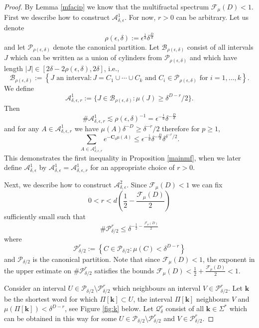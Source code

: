 \documentclass[10pt,a4paper]{amsart}
\def\A{\ensuremath{\mathscr A}}
\def\F{\ensuremath{\mathcal F}}
\begin{document}
\begin{proof}
By Lemma \ref{mfacip} we know that the multifractal spectrum $\F_\mu(D)<1$. First we describe how to construct $ \A^1_{\delta,\epsilon}$. For now, $r>0$ can be arbitrary. Let us denote 
$$\rho(\epsilon,\delta):=\epsilon^{\frac{1}{d}}\delta^{\frac{D}{d}}$$ and let $\mathscr{P}_{\rho(\epsilon,\delta)}$ denote the canonical partition. Let $\mathcal{B}_{\rho(\epsilon,\delta)}$ consist of all intervals $J$ which can be written as a union of cylinders from $\mathscr{P}_{\rho(\epsilon,\delta)}$ and which have length $|J| \in [2\delta-2\rho(\epsilon,\delta), 2\delta]$, i.e., 
$$\mathcal{B}_{\rho(\epsilon,\delta)}:= \left\{ J \text{ an interval}: J= C_1\cup\cdots \cup C_k \text{ and } C_i\in \mathscr{P}_{\rho(\epsilon,\delta)} \text{ for } i=1, \ldots, k\right\}.$$
 We define
$$\A^1_{\delta,\epsilon,r}:=\{J \in \mathcal{B}_{\rho(\epsilon,\delta)}: \mu(J) \geq \delta^{D-r}/2\}.$$
Then 
$$\#\A^1_{\delta,\epsilon,r} \lesssim \rho(\epsilon,\delta)^{-1}=\epsilon^{-\frac{1}{d}}\delta^{-\frac{D}{d}}$$
and for any $A \in \A^1_{\delta,\epsilon,r}$ we have $\mu(A)\delta^{-D} \geq \delta^{-r}/2$ therefore for $p \geq 1$,
$$\sum_{A \in \A^1_{\delta,\epsilon,r}} e^{-\mathbf{C}_\delta \mu(A)} \leq \epsilon^{-\frac{1}{d}}\delta^{-\frac{D}{d}}\delta^{\delta^{-r}/2}.$$
This demonstrates the first inequality in Proposition \ref{mainmf}, when we later define $\A^1_{\delta,\epsilon}$ by $\A^1_{\delta,\epsilon}=\A^1_{\delta,\epsilon,r}$ for an appropriate choice of $r>0$. 

Next, we describe how to construct $ \A^2_{\delta,\epsilon}$. Since $\F_\mu(D)<1$ we can fix 
$$0<r<d\left(\frac{1}{2}-\frac{\F_\mu(D)}{2}\right)$$
sufficiently small such that 
$$\#\mathscr{P}_{\delta/2}^r \leq \delta^{-\frac{1}{2}-\frac{\F_\mu(D)}{2}}$$
 where
$$\mathscr{P}_{\delta/2}^r:=\left\{C \in \mathscr{P}_{\delta/2}: \mu(C) < \delta^{D-r}\right\}$$
and $\mathscr{P}_{\delta/2}$ is the canonical partition. Note that since $\F_\mu(D)<1$, the exponent in the upper estimate on $\#\mathscr{P}_{\delta/2}^r$ satisfies the bounds $\F_\mu(D)< \frac{1}{2}+\frac{\F_\mu(D)}{2}<1.$


Consider an interval $U \in\mathscr{P}_{\delta/2} \setminus\mathscr{P}_{\delta/2}^r$ which neighbours an interval $V \in\mathscr{P}_{\delta/2}^r$. Let $\mathbf{k}$ be the shortest word for which $\Pi[\mathbf{k}] \subset U$, the interval $\Pi[\mathbf{k}]$  neighbours $V$ and  $\mu(\Pi[\mathbf{k}])<\delta^{D-r}$, see Figure \ref{fig:k} below. Let $\mathcal{Q}_\delta^r$ consist of all $\mathbf{k}\in \Sigma^*$ which can be obtained in this way for some $U \in\mathscr{P}_{\delta/2} \setminus\mathscr{P}_{\delta/2}^r$ and $V \in\mathscr{P}_{\delta/2}^r$. 


\end{proof}
\end{document}
